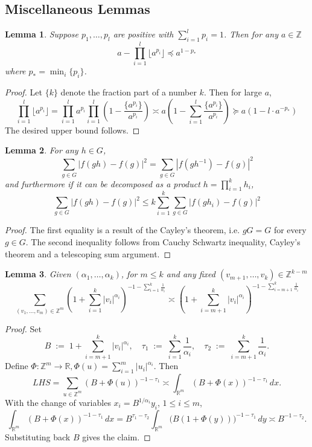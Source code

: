 \documentclass[pdflatex,sn-mathphys-num]{sn-jnl}%
\theoremstyle{thmstyleone}%
\theoremstyle{thmstyletwo}%
\theoremstyle{thmstylethree}%
\newtheorem{lem}{Lemma}%
\begin{document}
\begin{appendices}

\section{Miscellaneous Lemmas}

\begin{lem}
    \label{lem: floor}
    Suppose $p_1,\ldots, p_l$ are positive with
    $\sum_{i=1}^l p_i = 1$. Then for any $a\in \mathbb{Z}$ 
    $$a - \prod_{i=1}^l \lfloor a^{p_i}
    \rfloor \preccurlyeq a^{1-p_*}$$
    where $p_* = \min_i\{p_i\}$. 
\end{lem}
\begin{proof}
   Let $\{k\}$ denote the fraction part of a number $k$. Then for large $a$, 
   $$ \prod_{i=1}^l \lfloor a^{p_i}
    \rfloor =  \prod_{i=1}^l a^{p_i}  \prod_{i=1}^l \left(1 - \frac{\{a^{p_i}\}}{a^{p_i}}\right) \asymp a  \left(1 - \sum_{i=1}^l \frac{\{a^{p_i}\}}{a^{p_i}}\right) \succcurlyeq a (1- l\cdot a^{-p_*}) $$
    The desired upper bound follows. 
\end{proof}



\begin{lem}
\label{lem: decomp}
For any $h \in G$, 
$$\sum_{g\in G} |f(gh) - f(g)|^2  = \sum_{g\in G} |f(gh^{-1}) - f(g)|^2 $$
and furthermore if it can be decomposed as a product $h=\prod_{i=1}^k h_i$, $$\sum_{g\in G} |f(gh) - f(g)|^2 \le  
   k \sum_{i=1}^k \sum_{g\in G}|f(gh_i) - f(g)|^2 $$
\end{lem}
\begin{proof}
    The first equality is a result of the Cayley's theorem, i.e. $gG = G$ for every $g \in G$. The second inequality follows from Cauchy Schwartz inequality, Cayley's theorem and a telescoping sum argument. 
\end{proof}
\begin{lem}
Given $(\alpha_1,\ldots,\alpha_k)$, for  $m \le k$ and any fixed $(v_{m+1}, \ldots, v_k) \in \mathbb{Z}^{k-m}$
    \label{lem: sum}
    $$\sum_{(v_1, \ldots, v_m) \in \mathbb{Z}^{m}} \left(1+ \sum_{i=1}^k |v_i|^{\alpha_i} \right)^{-1 - \sum_{i=1}^k \frac{1}{\alpha_i}} \asymp \left(1 + \sum_{i=m+1}^k |v_i|^{\alpha_i}\right)^{-1 - \sum_{i=m+1}^k \frac{1}{\alpha_i}} $$
\end{lem}
\begin{proof}
    Set
$$
B \;:=\; 1+\sum_{i=m+1}^k |v_i|^{\alpha_i},\quad
\tau_1 \;:=\; \sum_{i=1}^k \frac1{\alpha_i},\quad 
\tau_2 \;:=\; \sum_{i=m+1}^k \frac1{\alpha_i} . 
$$
Define $\Phi: \mathbb{Z}^m \to  \mathbb{R}, \Phi(u) = \sum_{i=1}^m |u_i|^{\alpha_i}$. Then 
\[
LHS
=\sum_{u\in\mathbb Z^m}(B+\Phi(u))^{-1-\tau_1}
\asymp \int_{\mathbb R^m} (B+\Phi(x))^{-1-\tau_1}\,dx.
\]
With the change of variables $x_i=B^{1/\alpha_i}y_i$, $1\le i\le m$,
\[
\int_{\mathbb R^m} (B+\Phi(x))^{-1-\tau_1}\,dx
= B^{\tau_1-\tau_2}\int_{\mathbb R^m}\bigl(B(1+\Phi(y))\bigr)^{-1-\tau_1}\,dy
\asymp B^{-1-\tau_2}.
\]
Substituting back $B$ gives the claim.
\end{proof}



\end{appendices}
\end{document}
